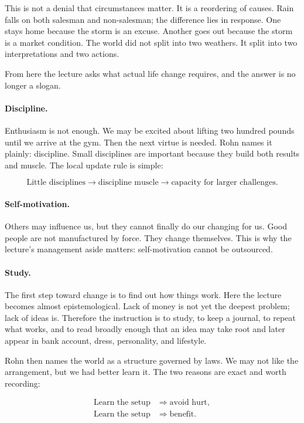 This is not a denial that circumstances matter. It is a reordering of causes. Rain falls on both salesman and non-salesman; the difference lies in response. One stays home because the storm is an excuse. Another goes out because the storm is a market condition. The world did not split into two weathers. It split into two interpretations and two actions.

From here the lecture asks what actual life change requires, and the answer is no longer a slogan.

\paragraph{Discipline.} Enthusiasm is not enough. We may be excited about lifting two hundred pounds until we arrive at the gym. Then the next virtue is needed. Rohn names it plainly: discipline. Small disciplines are important because they build both results and muscle. The local update rule is simple:

\begin{equation}
\text{Little disciplines} \to \text{discipline muscle} \to \text{capacity for larger challenges}.
\end{equation}

\paragraph{Self-motivation.} Others may influence us, but they cannot finally do our changing for us. Good people are not manufactured by force. They change themselves. This is why the lecture's management aside matters: self-motivation cannot be outsourced.

\paragraph{Study.} The first step toward change is to find out how things work. Here the lecture becomes almost epistemological. Lack of money is not yet the deepest problem; lack of ideas is. Therefore the instruction is to study, to keep a journal, to repeat what works, and to read broadly enough that an idea may take root and later appear in bank account, dress, personality, and lifestyle.

Rohn then names the world as a structure governed by laws. We may not like the arrangement, but we had better learn it. The two reasons are exact and worth recording:

\begin{align}
\text{Learn the setup} &\Longrightarrow \text{avoid hurt},\\
\text{Learn the setup} &\Longrightarrow \text{benefit}.
\end{align}

